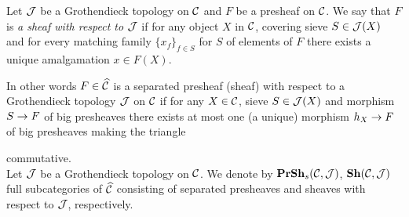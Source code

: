 \begin{definition}
Let ${\mathcal J}$ be a Grothendieck topology on ${\mathcal C}$ and $F$ be a presheaf on ${\mathcal C}$. We say that $F$ is \textit{a sheaf with respect to ${\mathcal J}$} if for any object $X$ in ${\mathcal C}$, covering sieve $S\in {\mathcal J}(X)$ and for every matching family $\{x_f\}_{f\in S}$ for $S$ of elements of $F$ there exists a unique amalgamation $x\in F(X)$.
\end{definition}
\noindent
In other words $F\in \widehat{{\mathcal C}}$ is a separated presheaf (sheaf) with respect to a Grothendieck topology ${\mathcal J}$ on ${\mathcal C}$ if for any $X\in {\mathcal C}$, sieve $S\in {\mathcal J}(X)$ and morphism $S\rightarrow F$ of big presheaves there exists at most one (a unique) morphism $h_X\rightarrow F$ of big presheaves making the triangle 
\begin{center}
\end{center}
commutative.\\
Let ${\mathcal J}$ be a Grothendieck topology on ${\mathcal C}$. We denote by $\mathbf{PrSh}_s({\mathcal C},{\mathcal J})$, $\mathbf{Sh}({\mathcal C},{\mathcal J})$  full subcategories of $\widehat{{\mathcal C}}$ consisting of separated presheaves and sheaves with respect to ${\mathcal J}$, respectively.

